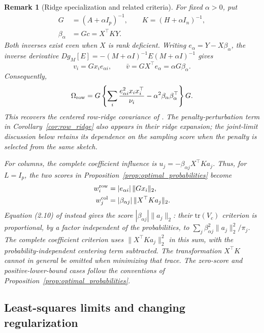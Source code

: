 \documentclass[pdflatex,iicol,sn-mathphys-ay]{sn-jnl}
\theoremstyle{thmstyleone}
\theoremstyle{thmstylethree}
\theoremstyle{thmstyletwo}
\newtheorem{remark}{Remark}
\newcommand{\tr}{\mathrm{tr}}
\begin{document}
\begin{remark}[Ridge specialization and related criteria]
\label{rem:ridge_specialization}
For fixed $\alpha>0$, put
\[
 \begin{aligned}
 G&=(A+\alpha I_p)^{-1},\qquad K=(H+\alpha I_n)^{-1},\\
 \beta_\alpha&=Gc=X^\top KY.
 \end{aligned}
\]
Both inverses exist even when $X$ is rank deficient. Writing
$e_\alpha=Y-X\beta_\alpha$, the inverse derivative
$Dg_M[E]=-(M+\alpha I)^{-1}E(M+\alpha I)^{-1}$ gives
\[
 v_i=Gx_i e_{\alpha i},\qquad
 \bar v=GX^\top e_\alpha=\alpha G\beta_\alpha.
\]
Consequently,
\begin{equation}\label{eq:ridge_row_covariance}
 \Omega_{\rm row}
 =G\left\{\sum_i\frac{e_{\alpha i}^2x_ix_i^\top}{\nu_i}
       -\alpha^2\beta_\alpha\beta_\alpha^\top\right\}G.
\end{equation}
This recovers the centered row-ridge covariance of
\citet{chen2022optimal}. The penalty-perturbation term in
Corollary~\ref{cor:row_ridge} also appears in their ridge expansion;
the joint-limit discussion below retains its dependence on the sampling
score when the penalty is selected from the same sketch.

For columns, the complete coefficient influence is
$u_j=-\beta_{\alpha j}X^\top Ka_j$. Thus, for $L=I_p$, the two scores in
Proposition~\ref{prop:optimal_probabilities} become
\begin{equation}\label{eq:ridge_complete_scores}
 \begin{aligned}
  w_i^{\rm row}&=|e_{\alpha i}|\,\|Gx_i\|_2,\\
  w_j^{\rm col}&=|\beta_{\alpha j}|\,\|X^\top Ka_j\|_2.
 \end{aligned}
\end{equation}
Equation (2.10) of \citet{li2024optimal} instead gives the score
$|\beta_{\alpha j}|\|a_j\|_2$: their $\tr(V_c)$ criterion is proportional,
by a factor independent of the probabilities, to
$\sum_j\beta_{\alpha j}^2\|a_j\|_2^2/\pi_j$.
The complete coefficient criterion uses $\|X^\top Ka_j\|_2^2$ in this sum,
with the probability-independent centering term subtracted.
The transformation $X^\top K$ cannot in general be omitted when minimizing
that trace. The zero-score and positive-lower-bound cases follow the conventions of Proposition~\ref{prop:optimal_probabilities}.
\end{remark}


\subsection{Least-squares limits and changing regularization}
\label{subsec:ls_limits}
\end{document}
